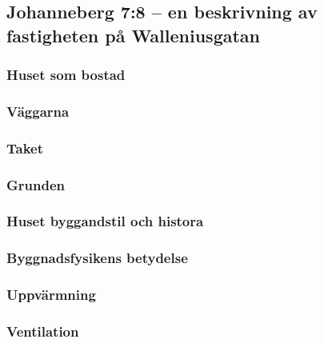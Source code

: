 \subsection{Johanneberg 7:8 – en beskrivning av fastigheten på Walleniusgatan}

\subsubsection{Huset som bostad}

\subsubsection{Väggarna}

\subsubsection{Taket}

\subsubsection{Grunden}


\subsubsection{Huset byggandstil och histora}

\subsubsection{Byggnadsfysikens betydelse}

\subsubsection{Uppvärmning}

\subsubsection{Ventilation}
